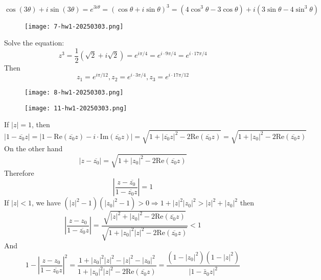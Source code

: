 \[
\cos(3\theta)+i\sin(3\theta)=e^{ 3i\theta }=(\cos\theta+i\sin\theta)^{3}=(4\cos ^{3}\theta-3\cos\theta)+i(3\sin\theta-4\sin ^{3}\theta)
\]
\begin{exercise}
\begin{figure}[H]
\centering
\texttt{[image: 7-hw1-20250303.png]}
\label{}
\end{figure}
\end{exercise}
Solve the equation:
\[
z^{3}=\frac{1}{2}(\sqrt{ 2 }+i\sqrt{ 2 })=e^{ i\pi/4 }=e^{ i\cdot9\pi/4 }=e^{ i\cdot17\pi/4 }
\]
Then
\[
z_{1}=e^{ i\pi/12 },z_{2}=e^{ i\cdot3\pi/4 },z_{3}=e^{ i\cdot17\pi/12 }
\]
\begin{exercise}
\begin{figure}[H]
\centering
\texttt{[image: 8-hw1-20250303.png]}
\label{}
\end{figure}
\end{exercise}
\begin{note}
\begin{figure}[H]
\centering
\texttt{[image: 11-hw1-20250303.png]}
\label{}
\end{figure}
\end{note}
If $\lvert z \rvert=1$, then
\[
\lvert 1-\overline{z_{0}}z \rvert =\lvert 1-\mathrm{Re}(\overline{z_{0}}z)-i\cdot \mathrm{Im}(\overline{z_{0}}z) \rvert =\sqrt{ 1+\lvert \overline{z_{0}}z \rvert ^{2} -2\mathrm{Re}(\overline{z_{0}}z) }=\sqrt{ 1+\lvert z_{0} \rvert ^{2} -2\mathrm{Re}(\overline{z_{0}}z) }
\]
On the other hand
\[
\lvert z-\overline{z_{0}} \rvert =\sqrt{ 1+\lvert z_{0} \rvert ^{2}-2\mathrm{Re}(\overline{z_{0}}z) }
\]
Therefore
\[
\left\lvert  \frac{z-\overline{z_{0}}}{1-\overline{z_{0}}z}  \right\rvert =1
\]
If $\lvert z \rvert<1$, we have $(\lvert z \rvert ^{2}-1)(\lvert z_{0} \rvert ^{2}-1)>0\Rightarrow1+\lvert z \rvert ^{2}\lvert z_{0} \rvert ^{2}>\lvert z \rvert ^{2}+\lvert z_{0} \rvert ^{2}$ then
\[
\left\lvert  \frac{z-z_{0}}{1-\overline{z_{0}}z}  \right\rvert =\frac{\sqrt{ \lvert z \rvert ^{2}+\lvert z_{0} \rvert ^{2}-2\mathrm{Re}(\overline{z_{0}}z) }}{\sqrt{ 1+\lvert z_{0} \rvert ^{2}\lvert z \rvert ^{2}-2\mathrm{Re}(\overline{z_{0}}z) }}<1
\]
And
\[
1-\left\lvert  \frac{z-z_{0}}{1-\overline{z_{0}}z}  \right\rvert ^{2}=\frac{1+\lvert z_{0} \rvert ^{2}\lvert z \rvert ^{2}-\lvert z \rvert ^{2}-\lvert z_{0} \rvert ^{2} }{1+\lvert z_{0} \rvert ^{2}\lvert z \rvert ^{2}-2\mathrm{Re}(\overline{z_{0}}z)}=\frac{\left(1-\left|z_0\right|^2\right)\left(1-|z|^2\right)}{\left|1-\bar{z}_0 z\right|^2}
\]
